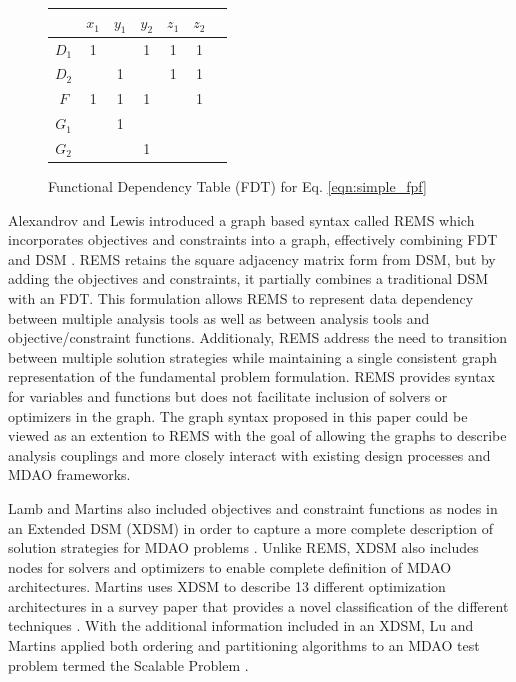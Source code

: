     \begin{figure}[htb!]
        \begin{center}
        \begin{tabular}{|c|c|c|c|c|c|c|}
            \hline
                   & $x_1$ & $y_1$ & $y_2$ & $z_1$ & $z_2$ \\ \hline
            $D_1$  & 1     &       & 1     & 1     & 1     \\ \hline
            $D_2$  &       & 1     &       & 1     & 1     \\ \hline
            $F$    & 1     & 1     & 1     &       & 1     \\ \hline
            $G_1$  &       & 1     &       &       &       \\ \hline
            $G_2$  &       &       & 1     &       &       \\
            \hline
        \end{tabular}
        \caption{Functional Dependency Table (FDT) for Eq. \ref{eqn:simple_fpf} \label{fig:FDT_simple}}
        \end{center}
    \end{figure}

    Alexandrov and Lewis introduced a graph based syntax called REMS which 
    incorporates objectives and constraints into a graph, effectively combining 
    FDT and DSM \cite{alexandrov2004}. REMS retains the square adjacency 
    matrix form from DSM, but by adding the objectives and constraints, it partially 
    combines a traditional DSM with an FDT. This formulation allows REMS to represent data 
    dependency between multiple analysis tools as well as between analysis tools and
    objective/constraint functions. Additionaly, REMS address the need to
    transition between multiple solution strategies while maintaining a single consistent  
    graph representation of the fundamental problem formulation. REMS provides
    syntax for variables and functions but does not facilitate inclusion 
    of solvers or optimizers in the graph.  The 
     graph syntax proposed in this paper could  
    be viewed as an extention to REMS with the goal of allowing the graphs to  describe analysis couplings and more 
    closely interact with existing design processes and MDAO frameworks. 

    Lamb and Martins also included objectives and constraint functions as nodes 
    in an Extended DSM (XDSM) in order to capture a more complete description 
    of solution strategies for MDAO problems \cite{Lambe2012}. Unlike REMS, 
    XDSM also includes nodes for solvers and optimizers to enable complete 
    definition of MDAO architectures. Martins uses XDSM to describe 13 different 
    optimization architectures in a survey paper that provides a novel 
    classification of the different techniques \cite{Lambe2011}. With the 
    additional information included in an XDSM, Lu and Martins applied both 
    ordering and partitioning algorithms to an MDAO test problem termed the 
    Scalable Problem \cite{Lu2012}. 

